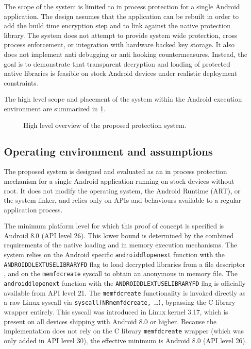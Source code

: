 \documentclass[11pt,a4paper]{report}
\renewcommand\_{{\textunderscore\allowbreak}}
\begin{document}
The scope of the system is limited to in process protection for a single Android application. The design assumes that the application can be rebuilt in order to add the build time encryption step and to link against the native protection library. The system does not attempt to provide system wide protection, cross process enforcement, or integration with hardware backed key storage. It also does not implement anti debugging or anti hooking countermeasures. Instead, the goal is to demonstrate that transparent decryption and loading of protected native libraries is feasible on stock Android devices under realistic deployment constraints.

The high level scope and placement of the system within the Android execution environment are summarized in \cref{fig:system_scope_mermaid}.

\begin{figure}[p]
    \centering
    
    \caption{High level overview of the proposed protection system.}
    \label{fig:system_scope_mermaid}
\end{figure}

\subsection{Operating environment and assumptions}

The proposed system is designed and evaluated as an in process protection mechanism for a single Android application running on stock devices without root. It does not modify the operating system, the Android Runtime (ART), or the system linker, and relies only on APIs and behaviours available to a regular application process.

The minimum platform level for which this proof of concept is specified is Android 8.0 (API level 26). This lower bound is determined by the combined requirements of the native loading and in memory execution mechanisms. The system relies on the Android specific \texttt{android\_dlopen\_ext} function with the \texttt{ANDROID\_DLEXT\_USE\_LIBRARY\_FD} flag to load decrypted libraries from a file descriptor \cite{android_ndk_dlext}, and on the \texttt{memfd\_create} syscall to obtain an anonymous in memory file. The \texttt{android\_dlopen\_ext} function with the \texttt{ANDROID\_DLEXT\_USE\_LIBRARY\_FD} flag is officially available from API level 21. The \texttt{memfd\_create} functionality is invoked directly as a raw Linux syscall via \texttt{syscall(\_\_NR\_memfd\_create, \ldots)}, bypassing the C library wrapper entirely. This syscall was introduced in Linux kernel 3.17, which is present on all devices shipping with Android 8.0 or higher. Because the implementation does not rely on the C library \texttt{memfd\_create} wrapper (which was only added in API level 30), the effective minimum is Android 8.0 (API level 26).
\end{document}
